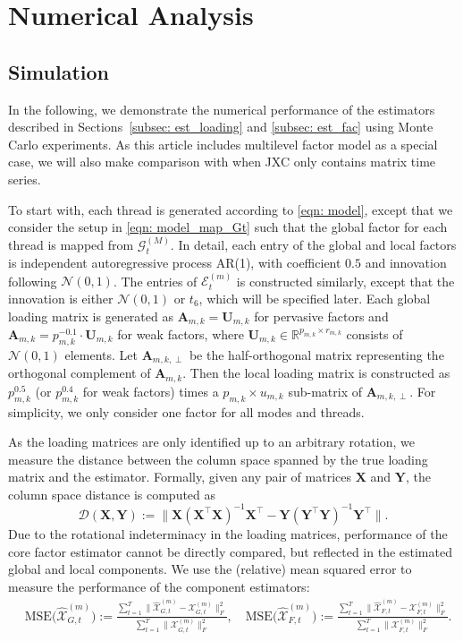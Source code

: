 \documentclass[aos]{imsart}
\theoremstyle{plain}
\theoremstyle{definition}
\def\wh#1{\widehat{#1}}
\def\R{\mathbb{R}}
\def\cD{\mathcal{D}}
\def\cE{\mathcal{E}}
\def\cG{\mathcal{G}} \def\cH{\boldsymbol{\mathcal{H}}} \def\cI{\mathcal{I}}
\def\cN{\mathcal{N}}
\def\cX{\mathcal{X}}
\def\bA{\mathbf{A}}
\def\bX{\mathbf{X}}
\def\bY{\mathbf{Y}}
\def\bU{\mathbf{U}}
\def\trans{\intercal}
\begin{document}
\section{Numerical Analysis}
\label{sec: numerical}

\subsection{Simulation}
\label{subsec: simulation}

In the following, we demonstrate the numerical performance of the estimators described in Sections~\ref{subsec: est_loading} and \ref{subsec: est_fac} using Monte Carlo experiments. As this article includes multilevel factor model as a special case, we will also make comparison with \cite{Zhangetal2025} when JXC only contains matrix time series.

To start with, each thread is generated according to \eqref{eqn: model}, except that we consider the setup in \eqref{eqn: model_map_Gt} such that the global factor for each thread is mapped from $\cG_t^{(M)}$. In detail, each entry of the global and local factors is independent autoregressive process AR(1), with coefficient $0.5$ and innovation following  $\cN(0,1)$. The entries of $\cE_t^{(m)}$ is constructed similarly, except that the innovation is either $\cN(0,1)$ or $t_6$, which will be specified later. Each global loading matrix is generated as $\bA_{m,k} = \bU_{m,k}$ for pervasive factors and $\bA_{m,k} = p_{m,k}^{-0.1} \cdot \bU_{m,k}$ for weak factors, where $\bU_{m,k}\in \R^{p_{m,k}\times r_{m,k}}$ consists of  $\cN(0,1)$ elements. Let $\bA_{m,k,\perp}$ be the half-orthogonal matrix representing the orthogonal complement of $\bA_{m,k}$. Then the local loading matrix is constructed as $p_{m,k}^{0.5}$ (or $p_{m,k}^{0.4}$ for weak factors) times a $p_{m,k}\times u_{m,k}$ sub-matrix of $\bA_{m,k,\perp}$. For simplicity, we only consider one factor for all modes and threads.


As the loading matrices are only identified up to an arbitrary rotation, we measure the distance between the column space spanned by the true loading matrix and the estimator. Formally, given any pair of matrices $\bX$ and $\bY$, the column space distance is computed as
\[
\cD(\bX, \bY) := \Big\| \bX(\bX^\trans \bX)^{-1} \bX^\trans -\bY(\bY^\trans \bY)^{-1} \bY^\trans \Big\| .
\]
Due to the rotational indeterminacy in the loading matrices, performance of the core factor estimator cannot be directly compared, but reflected in the estimated global and local components. We use the (relative) mean squared error to measure the performance of the component estimators:
\begin{align*}
    & \text{MSE}\big(\wh\cX_{G,t}^{(m)} \big) := \frac{ \sum_{t=1}^{T} \big\| \wh\cX_{G,t}^{(m)} - \cX_{G,t}^{(m)} \big\|_F^2}{ \sum_{t=1}^{T} \big\| \cX_{G,t}^{(m)} \big\|_F^2} , \quad
    \text{MSE}\big(\wh\cX_{F,t}^{(m)} \big) := \frac{\sum_{t=1}^{T} \big\| \wh\cX_{F,t}^{(m)} - \cX_{F,t}^{(m)} \big\|_F^2}{ \sum_{t=1}^{T} \big\| \cX_{F,t}^{(m)} \big\|_F^2} .
\end{align*}
\end{document}
